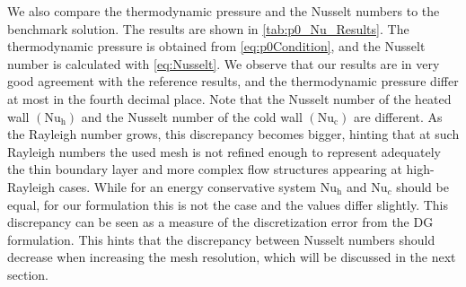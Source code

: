 We also compare the thermodynamic pressure and the Nusselt numbers to the benchmark solution. The results are shown in \cref{tab:p0_Nu_Results}. The thermodynamic pressure is obtained from \cref{eq:p0Condition}, and the Nusselt number is calculated with \cref{eq:Nusselt}. We observe that our results are in very good agreement with the reference results, and the thermodynamic pressure differ at most in the fourth decimal place. Note that the Nusselt number of the heated  wall $(\text{Nu}_\text{h})$ and the Nusselt number of the cold wall $(\text{Nu}_\text{c})$ are different.  As the Rayleigh number grows, this discrepancy becomes bigger, hinting that at such Rayleigh numbers the used mesh is not refined enough  to represent adequately the thin boundary layer and more complex flow structures appearing at high-Rayleigh cases. While for an energy conservative system $\text{Nu}_\text{h}$ and $\text{Nu}_c$ should be equal, for our formulation this is not the case and the values differ slightly. This discrepancy can be seen as a measure of the discretization error from the DG formulation.\cite{kleinHighorderDiscontinuousGalerkin2016} This hints that the discrepancy between Nusselt numbers should decrease when increasing the mesh resolution, which will be discussed in the next section. 


